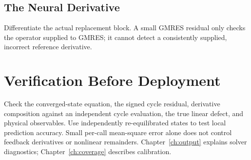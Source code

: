 \subsection{The Neural Derivative}
\label{pit:jacobian}
Differentiate the actual replacement block. A small GMRES residual only checks
the operator supplied to GMRES; it cannot detect a consistently supplied,
incorrect reference derivative.

\section{Verification Before Deployment}
\label{sec:debug-recipe}
\label{sec:checklist}
Check the converged-state equation, the signed cycle residual, derivative
composition against an independent cycle evaluation, the true linear defect,
and physical observables. Use independently re-equilibrated states to test
local prediction accuracy. Small per-call mean-square error alone does not
control feedback derivatives or nonlinear remainders. Chapter~\ref{ch:output}
explains solver diagnostics; Chapter~\ref{ch:coverage} describes calibration.
